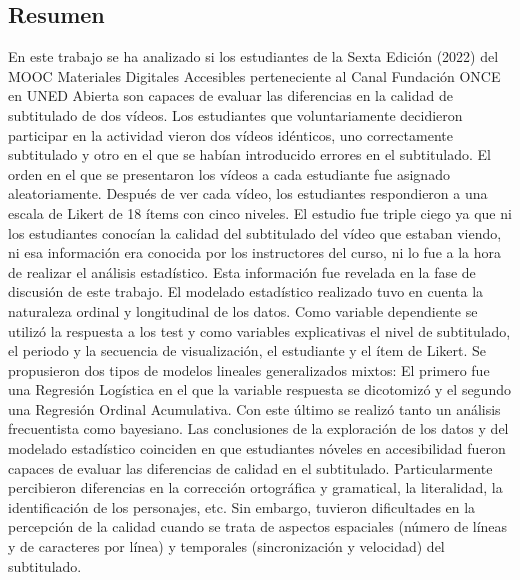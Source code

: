 \documentclass[
  12pt,
  a4paper,
  extrafontsizes,
  onecolumn,
  openright,
  table]{memoir}
\begin{document}
\makeatletter
\begin{center} %
\chapter*{Resumen} %
\end{center}   
\makeatother
En este trabajo se ha analizado si los estudiantes de la Sexta Edición (2022) del MOOC Materiales Digitales Accesibles
perteneciente al Canal Fundación \nobreak ONCE en UNED Abierta son capaces de evaluar las diferencias
en la calidad de subtitulado de dos vídeos. Los estudiantes que voluntariamente decidieron
participar en la actividad vieron dos vídeos idénticos, uno correctamente subtitulado y otro
en el que se habían introducido errores en el subtitulado. El orden en el que se presentaron los vídeos a cada estudiante
fue asignado aleatoriamente. Después de ver cada vídeo, los estudiantes respondieron a una escala de Likert de 18
ítems con cinco niveles. El estudio fue triple ciego ya que ni los estudiantes conocían la calidad
del subtitulado del vídeo que estaban viendo, ni esa información era conocida por los instructores del curso, ni lo fue a la
hora de realizar el análisis estadístico. Esta información fue revelada en la fase de discusión de este trabajo.
El modelado estadístico realizado tuvo en cuenta la naturaleza ordinal y longitudinal de los datos. Como variable dependiente se
utilizó la respuesta a los test y como variables explicativas el nivel de subtitulado, el periodo y la secuencia de visualización,
el estudiante y el ítem de Likert. Se propusieron dos tipos de modelos lineales generalizados mixtos:
El primero fue una Regresión Logística en el que la variable
respuesta se dicotomizó y el segundo una Regresión Ordinal Acumulativa. Con este último se realizó tanto un análisis frecuentista
como bayesiano. Las conclusiones de la exploración de los datos y del modelado estadístico 
coinciden en que estudiantes nóveles en accesibilidad
fueron capaces de evaluar las diferencias de calidad en el subtitulado. Particularmente percibieron diferencias en la
corrección ortográfica y gramatical, la literalidad, la identificación de los personajes, etc. Sin embargo, tuvieron dificultades en
la percepción de la calidad cuando se trata de aspectos espaciales (número de líneas y de caracteres por línea)
y temporales (sincronización y velocidad) del subtitulado.
\end{document}
